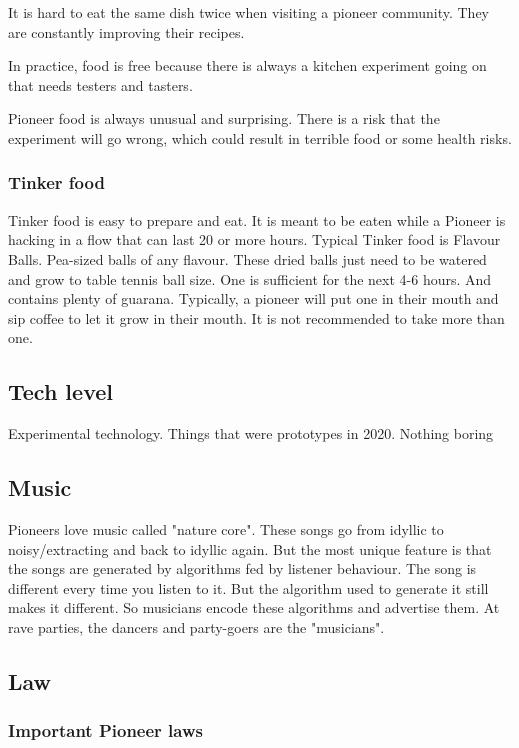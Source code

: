 It is hard to eat the same dish twice when visiting a pioneer community. They are constantly improving their recipes.

In practice, food is free because there is always a kitchen experiment going on that needs testers and tasters.

Pioneer food is always unusual and surprising. There is a risk that the experiment will go wrong, which could result in terrible food or some health risks.

\subsubsection{Tinker food}

Tinker food is easy to prepare and eat. It is meant to be eaten while a Pioneer is hacking in a flow that can last 20 or more hours. Typical Tinker food is Flavour Balls. Pea-sized balls of any flavour. These dried balls just need to be watered and grow to table tennis ball size. One is sufficient for the next 4-6 hours. And contains plenty of guarana.
Typically, a pioneer will put one in their mouth and sip coffee to let it grow in their mouth. It is not recommended to take more than one.

\subsection{Tech level}

Experimental technology. Things that were prototypes in 2020. Nothing boring

\subsection{Music}

Pioneers love music called "nature core". These songs go from idyllic to noisy/extracting and back to idyllic again. But the most unique feature is that the songs are generated by algorithms fed by listener behaviour.
The song is different every time you listen to it. But the algorithm used to generate it still makes it different. So musicians encode these algorithms and advertise them. At rave parties, the dancers and party-goers are the "musicians".

\subsection{Law}
\label{sec: pioneer law}

\subsubsection{Important Pioneer laws}


